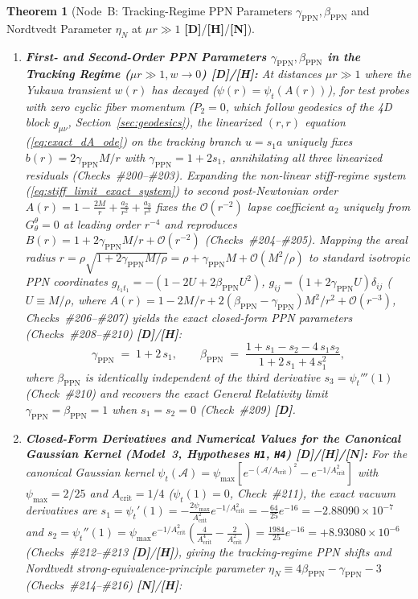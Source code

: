 \documentclass[11pt,a4paper]{article}
\newcommand{\catD}{\textbf{\textcolor{blue!75!black}{[D]}}}
\newcommand{\catH}{\textbf{\textcolor{orange!85!black}{[H]}}}
\newcommand{\catN}{\textbf{\textcolor{teal!75!black}{[N]}}}
\newtheorem{theorem}{Theorem}[section]
\theoremstyle{definition}
\theoremstyle{remark}
\begin{document}
\begin{theorem}[Node~B: Tracking-Regime PPN Parameters $\gamma_{\text{PPN}}, \beta_{\text{PPN}}$ and Nordtvedt Parameter $\eta_N$ at $\mu r \gg 1$ \catD/\catH/\catN]
\begin{enumerate}
  \item[\textnormal{(ii)}] \textbf{First- and Second-Order PPN Parameters $\gamma_{\text{PPN}}, \beta_{\text{PPN}}$ in the Tracking Regime ($\mu r \gg 1, w \to 0$) \catD/\catH:} At distances $\mu r \gg 1$ where the Yukawa transient $w(r)$ has decayed ($\psi(r) = \psi_t(A(r))$), for test probes with zero cyclic fiber momentum ($P_2 = 0$, which follow geodesics of the 4D block $g_{\mu\nu}$, Section~\ref{sec:geodesics}), the linearized $(r,r)$ equation (\ref{eq:exact_dA_ode}) on the tracking branch $u = s_1 a$ uniquely fixes $b(r) = 2\gamma_{\text{PPN}}M/r$ with $\gamma_{\text{PPN}} = 1 + 2s_1$, annihilating all three linearized residuals (Checks~\#200--\#203). Expanding the non-linear stiff-regime system (\ref{eq:stiff_limit_exact_system}) to second post-Newtonian order $A(r) = 1 - \frac{2M}{r} + \frac{a_2}{r^2} + \frac{a_3}{r^3}$ fixes the $\mathcal{O}(r^{-2})$ lapse coefficient $a_2$ uniquely from $G^\theta_\theta = 0$ at leading order $r^{-4}$ and reproduces $B(r) = 1 + 2\gamma_{\text{PPN}}M/r + \mathcal{O}(r^{-2})$ (Checks~\#204--\#205). Mapping the areal radius $r = \rho\sqrt{1 + 2\gamma_{\text{PPN}}M/\rho} = \rho + \gamma_{\text{PPN}}M + \mathcal{O}(M^2/\rho)$ to standard isotropic PPN coordinates $g_{t_1 t_1} = -(1 - 2U + 2\beta_{\text{PPN}}U^2)$, $g_{ij} = (1 + 2\gamma_{\text{PPN}}U)\delta_{ij}$ ($U \equiv M/\rho$, where $A(r) = 1 - 2M/r + 2(\beta_{\text{PPN}} - \gamma_{\text{PPN}})M^2/r^2 + \mathcal{O}(r^{-3})$, Checks~\#206--\#207) yields the exact closed-form PPN parameters (Checks~\#208--\#210) \catD/\catH:
  \begin{equation}
    \gamma_{\text{PPN}} \;=\; 1 + 2\,s_1, \qquad
    \beta_{\text{PPN}} \;=\; \frac{1 + s_1 - s_2 - 4\,s_1 s_2}{1 + 2\,s_1 + 4\,s_1^2},
    \label{eq:node_b_gamma_beta_exact}
  \end{equation}
  where $\beta_{\text{PPN}}$ is identically independent of the third derivative $s_3 = \psi_t'''(1)$ (Check~\#210) and recovers the exact General Relativity limit $\gamma_{\text{PPN}} = \beta_{\text{PPN}} = 1$ when $s_1 = s_2 = 0$ (Check~\#209) \catD.
  \item[\textnormal{(iii)}] \textbf{Closed-Form Derivatives and Numerical Values for the Canonical Gaussian Kernel (Model~3, Hypotheses \texttt{H1}, \texttt{H4}) \catD/\catH/\catN:} For the canonical Gaussian kernel $\psi_t(\mathcal{A}) = \psi_{\max}[e^{-(\mathcal{A}/A_{\text{crit}})^2} - e^{-1/A_{\text{crit}}^2}]$ with $\psi_{\max} = 2/25$ and $A_{\text{crit}} = 1/4$ ($\psi_t(1) = 0$, Check~\#211), the exact vacuum derivatives are $s_1 = \psi_t'(1) = -\frac{2\psi_{\max}}{A_{\text{crit}}^2}e^{-1/A_{\text{crit}}^2} = -\frac{64}{25}e^{-16} = -2.88090 \times 10^{-7}$ and $s_2 = \psi_t''(1) = \psi_{\max}e^{-1/A_{\text{crit}}^2}(\frac{4}{A_{\text{crit}}^4} - \frac{2}{A_{\text{crit}}^2}) = \frac{1984}{25}e^{-16} = +8.93080 \times 10^{-6}$ (Checks~\#212--\#213 \catD/\catH), giving the tracking-regime PPN shifts and Nordtvedt strong-equivalence-principle parameter $\eta_N \equiv 4\beta_{\text{PPN}} - \gamma_{\text{PPN}} - 3$ (Checks~\#214--\#216) \catN/\catH:

\end{enumerate}
\end{theorem}
\end{document}
